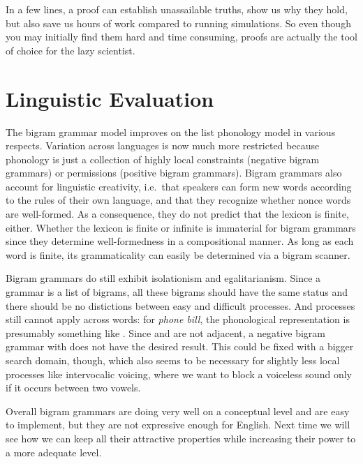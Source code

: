 In a few lines, a proof can establish unassailable truths, show us why they hold, but also save us hours of work compared to running simulations.
So even though you may initially find them hard and time consuming, proofs are actually the tool of choice for the lazy scientist.


\section{Linguistic Evaluation}
The bigram grammar model improves on the list phonology model in various respects.
Variation across languages is now much more restricted because phonology is just a collection of highly local constraints (negative bigram grammars) or permissions (positive bigram grammars).
Bigram grammars also account for linguistic creativity, i.e.\ that speakers can form new words according to the rules of their own language, and that they recognize whether nonce words are well-formed.
As a consequence, they do not predict that the lexicon is finite, either.
Whether the lexicon is finite or infinite is immaterial for bigram grammars since they determine well-formedness in a compositional manner.
As long as each word is finite, its grammaticality can easily be determined via a bigram scanner.

Bigram grammars do still exhibit isolationism and egalitarianism.
Since a grammar is a list of bigrams, all these bigrams should have the same status and there should be no distictions between easy and difficult processes.
And processes still cannot apply across words: for \emph{phone bill}, the phonological representation is presumably something like \LeftEdge{}\RightEdge\LeftEdge{}\RightEdge.
Since  and  are not adjacent, a negative bigram grammar with  does not have the desired result.
This could be fixed with a bigger search domain, though, which also seems to be necessary for slightly less local processes like intervocalic voicing, where we want to block a voiceless sound only if it occurs between two vowels.

Overall bigram grammars are doing very well on a conceptual level and are easy to implement, but they are not expressive enough for English.
Next time we will see how we can keep all their attractive properties while increasing their power to a more adequate level.

